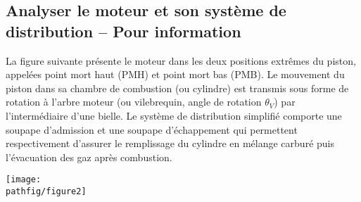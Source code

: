 \documentclass[10pt,fleqn]{article} %
\begin{document}

\vspace{5cm}
\pagestyle{fancy}
\thispagestyle{plain}

\def\columnseprulecolor{\color{ocre}}
\setlength{\columnseprule}{0.4pt} 

\def\pathfig{images}

\begin{multicols}{2}


\section*{Analyser le moteur et son système de distribution -- Pour information}

\footnotesize
La figure suivante %
présente le moteur dans les deux positions extrêmes du piston, appelées point mort haut (PMH) et point mort bas (PMB). Le mouvement du piston dans sa chambre de combustion (ou cylindre) est transmis sous forme de rotation à l'arbre moteur (ou vilebrequin, angle de rotation $\theta{}_{V}$) par l'intermédiaire d'une bielle. Le système de distribution simplifié comporte une soupape d'admission et une soupape d'échappement qui permettent respectivement d'assurer le remplissage du cylindre en mélange carburé puis l'évacuation des gaz après combustion. 



\begin{center}
\texttt{[image: \\pathfig/figure2]}
\end{center}









\end{multicols}
\end{document}
